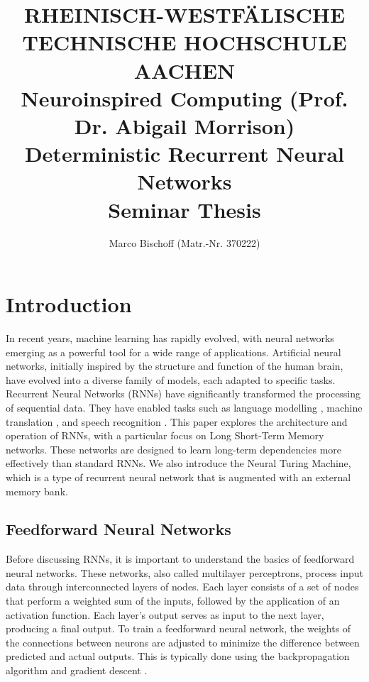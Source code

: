 \documentclass{article}
\title{
  {\bf \scriptsize
    RHEINISCH-WESTF\"ALISCHE TECHNISCHE HOCHSCHULE AACHEN \\
    Neuroinspired Computing (Prof. Dr. Abigail Morrison)
  } \vspace{2cm} \\
  Deterministic Recurrent Neural Networks \\
  {\large Seminar Thesis} 
}
\author{Marco Bischoff (Matr.-Nr. 370222)}
\begin{document}
\pagestyle{headings}

\maketitle
\newpage

\tableofcontents
\newpage



\section{Introduction}
\label{ch:1}

In recent years, machine learning has rapidly evolved, with neural networks emerging as a
powerful tool for a wide range of applications. Artificial neural networks, initially
inspired by the structure and function of the human brain, have evolved into a diverse
family of models, each adapted to specific tasks. Recurrent Neural Networks (RNNs) have
significantly transformed the processing of sequential data. They have enabled tasks such
as language modelling \cite{merity2017regularizing}, machine translation
\cite{choLearningPhraseRepresentations2014}, and speech recognition
\cite{graves2013speech}. This paper explores the architecture and operation of RNNs, with
a particular focus on Long Short-Term Memory networks. These networks are designed to
learn long-term dependencies more effectively than standard RNNs. We also introduce the
Neural Turing Machine, which is a type of recurrent neural network that is augmented with
an external memory bank.


\subsection{Feedforward Neural Networks}
\label{sec:1.0}

Before discussing RNNs, it is important to understand the basics of feedforward neural
networks. These networks, also called multilayer perceptrons, process input data through
interconnected layers of nodes. Each layer consists of a set of nodes that perform a
weighted sum of the inputs, followed by the application of an activation function. Each
layer's output serves as input to the next layer, producing a final output. To train a
feedforward neural network, the weights of the connections between neurons are adjusted to
minimize the difference between predicted and actual outputs. This is typically done using
the backpropagation algorithm and gradient descent \cite{mitchell_machine_1997}.
\end{document}
